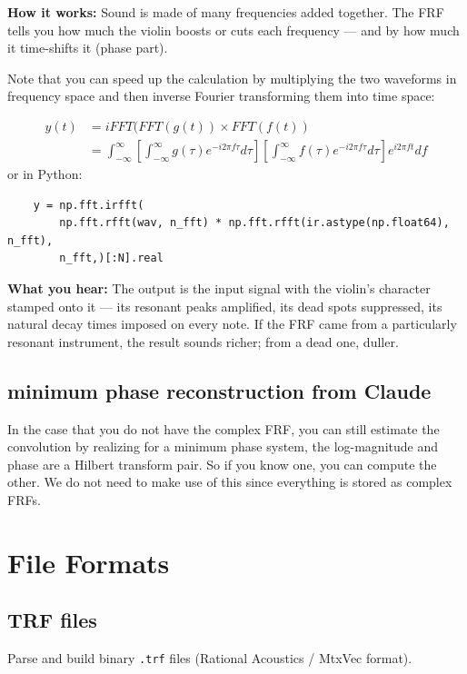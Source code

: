 \documentclass[11pt, oneside]{article}   	%
\begin{document}
\textbf{How it works: }
Sound is made of many frequencies added together. The FRF tells you how much the violin boosts or cuts each frequency — and by how much it time-shifts it (phase part).

Note that you can speed up the calculation by multiplying the two waveforms in frequency space and then inverse Fourier transforming them into time space:

\begin{equation}
    \begin{split}
        y(t) &= iFFT(FFT(g(t))\times FFT(f(t))\\
        &= \int_{-\infty}^\infty [\int_{-\infty}^\infty g(\tau)e^{-i2\pi f\tau}d\tau][\int_{-\infty}^\infty f(\tau)e^{-i2\pi f\tau} d\tau]e^{i2\pi ft}df
    \end{split}
\end{equation}
or in Python:
\begin{verbatim}
    y = np.fft.irfft(
        np.fft.rfft(wav, n_fft) * np.fft.rfft(ir.astype(np.float64), n_fft),
        n_fft,)[:N].real
\end{verbatim}

\textbf{What you hear: }
The output is the input signal with the violin's character stamped onto it — its resonant peaks amplified, its dead spots suppressed, its natural decay times imposed on every note. If the FRF came from a particularly resonant instrument, the result sounds richer; from a dead one, duller.

\subsection{minimum phase reconstruction from Claude}
In the case that you do not have the complex FRF, you can still estimate the convolution by realizing for a minimum phase system, the log-magnitude and phase are a Hilbert transform pair. So if you know one, you can compute the other.  We do not need to make use of this since everything is stored as complex FRFs.

\section{File Formats}

\subsection{TRF files}
Parse and build binary \texttt{.trf} files (Rational Acoustics / MtxVec format).
\end{document}
